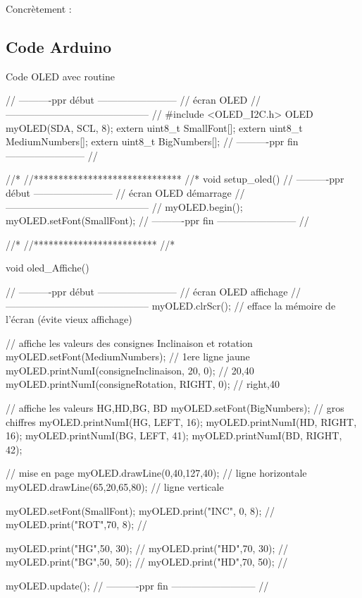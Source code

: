 Concrètement : 


\subsection{Code Arduino}

\begin{Cpp}{Code OLED avec routine}

    // ----------ppr début ------------------------
// écran OLED
// --------------------------------------------
//
#include <OLED_I2C.h>
OLED  myOLED(SDA, SCL, 8);
extern uint8_t SmallFont[];
extern uint8_t MediumNumbers[];
extern uint8_t BigNumbers[];
// ----------ppr fin   ------------------------
//

//*
//******************************
//*
void setup_oled() { 
  // ----------ppr début ------------------------
  // écran OLED démarrage
  // --------------------------------------------
  //
  myOLED.begin();
  myOLED.setFont(SmallFont);
  // ----------ppr fin   ------------------------
  //
 }  
  
 //*
 //*************************
 //*
  
 void oled_Affiche() {
  // ----------ppr début ------------------------
  // écran OLED affichage
  // --------------------------------------------
    myOLED.clrScr();   // efface la mémoire de l'écran (évite vieux affichage)

    // affiche les valeurs des consignes Inclinaison et rotation
    myOLED.setFont(MediumNumbers);   // 1ere ligne jaune
    myOLED.printNumI(consigneInclinaison, 20, 0);   // 20,40
    myOLED.printNumI(consigneRotation, RIGHT, 0);   // right,40

    // affiche les valeurs HG,HD,BG, BD 
    myOLED.setFont(BigNumbers);  // gros chiffres
    myOLED.printNumI(HG, LEFT, 16);
    myOLED.printNumI(HD, RIGHT, 16);
    myOLED.printNumI(BG, LEFT, 41);
    myOLED.printNumI(BD, RIGHT, 42);
    
    // mise en page 
    myOLED.drawLine(0,40,127,40);  // ligne horizontale 
    myOLED.drawLine(65,20,65,80);   // ligne verticale   
    
    myOLED.setFont(SmallFont);
    myOLED.print("INC", 0, 8);   // 
    myOLED.print("ROT",70, 8);   //  

    myOLED.print("HG",50, 30);    // 
    myOLED.print("HD",70, 30);    // 
    myOLED.print("BG",50, 50);    // 
    myOLED.print("HD",70, 50);    // 

    myOLED.update();
  // ----------ppr fin --------------------------
  //

}
\end{Cpp}